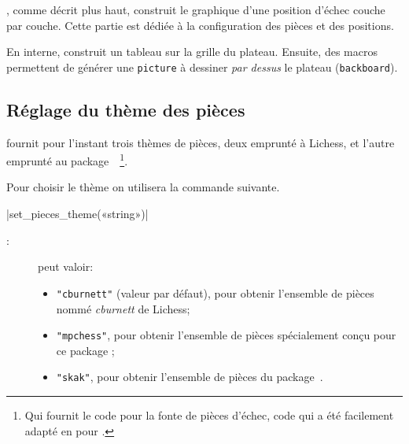 \documentclass[french]{ltxdoc}
\begin{document}
\mpchess, comme décrit plus haut, construit le graphique d’une position d’échec
couche par couche. Cette partie est dédiée à la configuration des pièces et des
positions.

En interne, \mpchess construit un tableau sur la grille du plateau. Ensuite, des
macros permettent de générer une \lstinline+picture+ à dessiner \emph{par
  dessus} le plateau (\lstinline+backboard+).

\subsection{Réglage du thème des pièces}

\mpchess fournit pour l’instant trois thèmes de pièces, deux emprunté à Lichess,
et l’autre emprunté au package~~\cite{ctan-skak}\footnote{Qui
  fournit le code \MF{} pour la fonte de pièces d’échec, code qui a été
  facilement adapté en \MP{} pour \mpchess.}.

Pour choisir le thème on utilisera la commande suivante.

\commande|set_pieces_theme(«string»)|\smallskip

\begin{description}
  \item[:] peut valoir:
\begin{itemize}
\item \lstinline+"cburnett"+ (valeur par défaut), pour obtenir l’ensemble de pièces nommé \emph{cburnett} de Lichess;

\item \lstinline+"mpchess"+, pour obtenir l’ensemble de pièces spécialement
conçu pour ce package ;
\item \lstinline+"skak"+, pour obtenir l’ensemble de pièces du package~.
\end{itemize}
\end{description}
\end{document}
